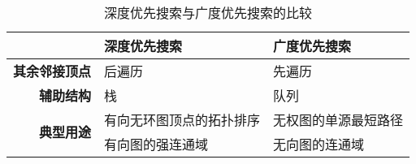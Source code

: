


\begin{frame}
    \frametitle{\insertsectionhead}
    \begin{table}
        \centering
        \small
        \setlength{\leftmargini}{0.4cm}
        \caption{深度优先搜索与广度优先搜索的比较}
        \label{tab:dfs_vs_bfs}
        \begin{tabular}{rll}
            \toprule
                                           & \textbf{深度优先搜索} & \textbf{广度优先搜索} \\
            \midrule
            \textbf{其余邻接顶点}                & 后遍历             & 先遍历             \\
            \midrule
            \textbf{辅助结构}                  & 栈               & 队列              \\
            \midrule
            \multirow{2}{*}{\textbf{典型用途}} & 有向无环图顶点的拓扑排序    & 无权图的单源最短路径      \\
                                           & 有向图的强连通域        & 无向图的连通域         \\
            \bottomrule
        \end{tabular}
    \end{table}
\end{frame}